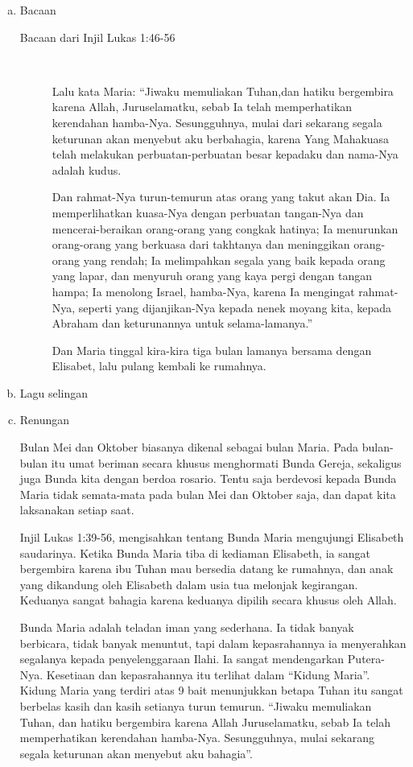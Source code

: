 \documentclass[a5paper,titlepage,12pt]{scrbook}
\begin{document}
\begin{itemize}
\begin{enumerate}[a.]
		\item Bacaan
			\begin{description}
				\item [Bacaan dari Injil Lukas  1:46-56] 
					{~}
 
Lalu kata Maria: ``Jiwaku memuliakan Tuhan,dan hatiku bergembira karena Allah, Juruselamatku,
sebab Ia telah memperhatikan kerendahan hamba-Nya. Sesungguhnya, mulai dari sekarang segala keturunan akan menyebut aku berbahagia,
karena Yang Mahakuasa telah melakukan perbuatan-perbuatan besar kepadaku dan nama-Nya adalah kudus.

Dan rahmat-Nya turun-temurun atas orang yang takut akan Dia.
Ia memperlihatkan kuasa-Nya dengan perbuatan tangan-Nya dan mencerai-beraikan orang-orang yang congkak hatinya;
Ia menurunkan orang-orang yang berkuasa dari takhtanya dan meninggikan orang-orang yang rendah;
Ia melimpahkan segala yang baik kepada orang yang lapar, dan menyuruh orang yang kaya pergi dengan tangan hampa;
Ia menolong Israel, hamba-Nya, karena Ia mengingat rahmat-Nya,
seperti yang dijanjikan-Nya kepada nenek moyang kita, kepada Abraham dan keturunannya untuk selama-lamanya.''

Dan Maria tinggal kira-kira tiga bulan lamanya bersama dengan Elisabet, lalu pulang kembali ke rumahnya.

			\end{description}
	
	   \item Lagu selingan		

		\item Renungan

Bulan Mei dan Oktober biasanya dikenal sebagai bulan Maria. Pada bulan-bulan itu umat beriman secara khusus menghormati Bunda Gereja, sekaligus juga Bunda kita dengan berdoa rosario. Tentu saja berdevosi kepada Bunda Maria tidak semata-mata pada bulan Mei dan Oktober saja, dan dapat kita laksanakan setiap saat.

Injil Lukas 1:39-56, mengisahkan tentang Bunda Maria mengujungi Elisabeth saudarinya. Ketika Bunda Maria tiba di kediaman Elisabeth, ia sangat bergembira karena ibu Tuhan mau bersedia datang ke rumahnya, dan anak yang dikandung oleh Elisabeth dalam usia tua melonjak kegirangan. Keduanya sangat bahagia karena keduanya dipilih secara khusus oleh Allah.

Bunda Maria adalah teladan iman yang sederhana. Ia tidak banyak berbicara, tidak banyak menuntut, tapi dalam kepasrahannya ia menyerahkan segalanya kepada penyelenggaraan Ilahi. Ia sangat mendengarkan Putera-Nya. Kesetiaan dan kepasrahannya itu terlihat dalam ``Kidung Maria''. Kidung Maria yang terdiri atas 9 bait menunjukkan betapa Tuhan itu sangat berbelas kasih dan kasih setianya turun temurun. ``Jiwaku memuliakan Tuhan, dan hatiku bergembira karena Allah Juruselamatku, sebab Ia telah memperhatikan kerendahan hamba-Nya. Sesungguhnya, mulai sekarang segala keturunan akan menyebut aku bahagia''.


\end{enumerate}
\end{itemize}
\end{document}
